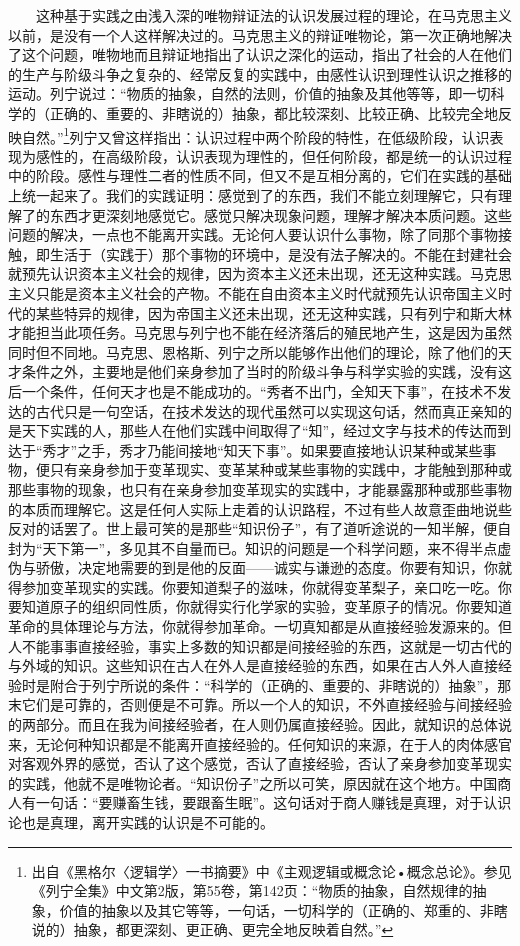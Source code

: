 \documentclass[cn,11pt,chinese]{elegantbook}
\begin{document}
　　这种基于实践之由浅入深的唯物辩证法的认识发展过程的理论，在马克思主义以前，是没有一个人这样解决过的。马克思主义的辩证唯物论，第一次正确地解决了这个问题，唯物地而且辩证地指出了认识之深化的运动，指出了社会的人在他们的生产与阶级斗争之复杂的、经常反复的实践中，由感性认识到理性认识之推移的运动。列宁说过：“物质的抽象，自然的法则，价值的抽象及其他等等，即一切科学的（正确的、重要的、非瞎说的）抽象，都比较深刻、比较正确、比较完全地反映自然。”\footnote[21]{ 出自《黑格尔〈逻辑学〉一书摘要》中《主观逻辑或概念论•概念总论》。参见《列宁全集》中文第2版，第55卷，第142页：“物质的抽象，自然规律的抽象，价值的抽象以及其它等等，一句话，一切科学的（正确的、郑重的、非瞎说的）抽象，都更深刻、更正确、更完全地反映着自然。”}列宁又曾这样指出：认识过程中两个阶段的特性，在低级阶段，认识表现为感性的，在高级阶段，认识表现为理性的，但任何阶段，都是统一的认识过程中的阶段。感性与理性二者的性质不同，但又不是互相分离的，它们在实践的基础上统一起来了。我们的实践证明：感觉到了的东西，我们不能立刻理解它，只有理解了的东西才更深刻地感觉它。感觉只解决现象问题，理解才解决本质问题。这些问题的解决，一点也不能离开实践。无论何人要认识什么事物，除了同那个事物接触，即生活于（实践于）那个事物的环境中，是没有法子解决的。不能在封建社会就预先认识资本主义社会的规律，因为资本主义还未出现，还无这种实践。马克思主义只能是资本主义社会的产物。不能在自由资本主义时代就预先认识帝国主义时代的某些特异的规律，因为帝国主义还未出现，还无这种实践，只有列宁和斯大林才能担当此项任务。马克思与列宁也不能在经济落后的殖民地产生，这是因为虽然同时但不同地。马克思、恩格斯、列宁之所以能够作出他们的理论，除了他们的天才条件之外，主要地是他们亲身参加了当时的阶级斗争与科学实验的实践，没有这后一个条件，任何天才也是不能成功的。“秀者不出门，全知天下事”，在技术不发达的古代只是一句空话，在技术发达的现代虽然可以实现这句话，然而真正亲知的是天下实践的人，那些人在他们实践中间取得了“知”，经过文字与技术的传达而到达于“秀才”之手，秀才乃能间接地“知天下事”。如果要直接地认识某种或某些事物，便只有亲身参加于变革现实、变革某种或某些事物的实践中，才能触到那种或那些事物的现象，也只有在亲身参加变革现实的实践中，才能暴露那种或那些事物的本质而理解它。这是任何人实际上走着的认识路程，不过有些人故意歪曲地说些反对的话罢了。世上最可笑的是那些“知识份子”，有了道听途说的一知半解，便自封为“天下第一”，多见其不自量而已。知识的问题是一个科学问题，来不得半点虚伪与骄傲，决定地需要的到是他的反面——诚实与谦逊的态度。你要有知识，你就得参加变革现实的实践。你要知道梨子的滋味，你就得变革梨子，亲口吃一吃。你要知道原子的组织同性质，你就得实行化学家的实验，变革原子的情况。你要知道革命的具体理论与方法，你就得参加革命。一切真知都是从直接经验发源来的。但人不能事事直接经验，事实上多数的知识都是间接经验的东西，这就是一切古代的与外域的知识。这些知识在古人在外人是直接经验的东西，如果在古人外人直接经验时是附合于列宁所说的条件：“科学的（正确的、重要的、非瞎说的）抽象”，那末它们是可靠的，否则便是不可靠。所以一个人的知识，不外直接经验与间接经验的两部分。而且在我为间接经验者，在人则仍属直接经验。因此，就知识的总体说来，无论何种知识都是不能离开直接经验的。任何知识的来源，在于人的肉体感官对客观外界的感觉，否认了这个感觉，否认了直接经验，否认了亲身参加变革现实的实践，他就不是唯物论者。“知识份子”之所以可笑，原因就在这个地方。中国商人有一句话：“要赚畜生钱，要跟畜生眠”。这句话对于商人赚钱是真理，对于认识论也是真理，离开实践的认识是不可能的。\\
\end{document}

